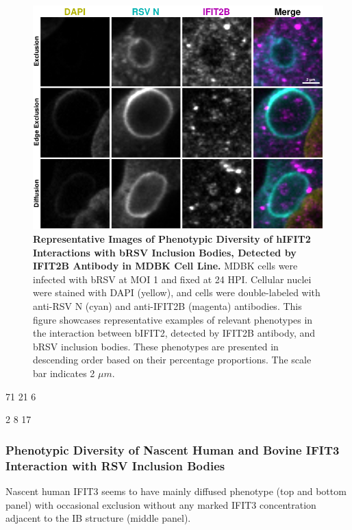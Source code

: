 \begin{figure}
    \centering
    \includegraphics[width=1\linewidth]{08. Chapter 3/Figs/02. Infection/02. IFIT2/02. IFIT2B/12. i2b mdbk brsv.pdf} 
    \caption[Representative Images of Phenotypic Diversity of hIFIT2 Interactions with bRSV Inclusion Bodies, Detected by IFIT2B Antibody in MDBK Cell Line.]{\textbf{Representative Images of Phenotypic Diversity of hIFIT2 Interactions with bRSV Inclusion Bodies, Detected by IFIT2B Antibody in MDBK Cell Line.} MDBK cells were infected with bRSV at MOI 1 and fixed at 24 HPI. Cellular nuclei were stained with DAPI (yellow), and cells were double-labeled with anti-RSV N (cyan) and anti-IFIT2B (magenta) antibodies. This figure showcases representative examples of relevant phenotypes in the interaction between bIFIT2, detected by IFIT2B antibody, and bRSV inclusion bodies. These phenotypes are presented in descending order based on their percentage proportions. The scale bar indicates 2 \(\mu m\).}
    \label{fig:Representative Images of Phenotypic Diversity of hIFIT2 Interactions with bRSV Inclusion Bodies, Detected by IFIT2B Antibody in MDBK Cell Line}
\end{figure}

71 21 6

2 8 17

\subsubsection{Phenotypic Diversity of Nascent Human and Bovine IFIT3 Interaction with RSV Inclusion Bodies}
Nascent human IFIT3 seems to have mainly diffused phenotype (top and bottom panel) with occasional exclusion without any marked IFIT3 concentration adjacent to the IB structure (middle panel).

